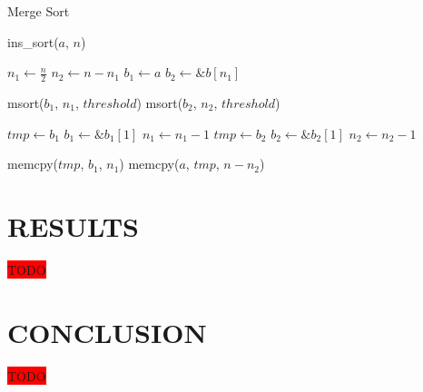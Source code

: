 \documentclass[letter, 12pt, conference]{ieeeconf}
\newcommand{\todo}{\colorbox{red}{TODO}}
\begin{document}
\begin{algorithm}[h]
	\caption{Merge Sort}
	\label{alg:merge_sort}
	\begin{algorithmic}
		\State \Return
		\EndIf

		\State ins\_sort($a$, $n$)
		\State \Return
		\EndIf

		\State $n_{1} \gets \frac{n}{2}$
		\State $n_{2} \gets n - n_{1}$
		\State $b_{1} \gets a$
		\State $b_{2} \gets \&b[n_{1}]$

		\State msort($b_{1}$, $n_{1}$, $threshold$)
		\State msort($b_{2}$, $n_{2}$, $threshold$)

		\State $tmp \gets b_{1}$
		\State $b_{1} \gets \&b_{1}[1]$
		\State $n_{1} \gets n_{1} - 1$
		\Else
		\State $tmp \gets b_{2}$
		\State $b_{2} \gets \&b_{2}[1]$
		\State $n_{2} \gets n_{2} - 1$
		\EndIf
		\EndWhile

			\State memcpy($tmp$, $b_{1}$, $n_{1}$)
		\EndIf
		\EndProcedure
		\State memcpy($a$, $tmp$, $n - n_{2}$)
	\end{algorithmic}
\end{algorithm}

\section{RESULTS}

\todo

\section{CONCLUSION}

\todo



\printbibliography
\end{document}
